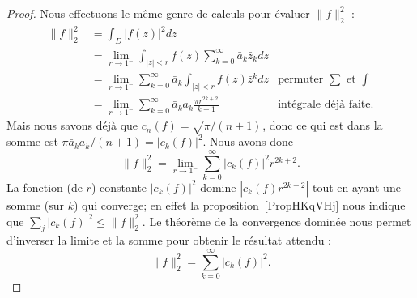 \begin{proof}
    Nous effectuons le même genre de calculs pour évaluer \( \| f \|^2_2\) :
    \begin{subequations}
        \begin{align}
            \| f \|_2^2&=\int_D| f(z) |^2dz\\
            &=\lim_{r\to 1^-}\int_{| z |<r}f(z)\sum_{k=0}^{\infty}\bar a_k\bar z_kdz\\
            &=\lim_{r\to 1^-}\sum_{k=0}^{\infty}\bar a_k\int_{| z |<r}f(z)\bar z^kdz&\text{permuter } \sum\text{ et } \int\\
            &=\lim_{r\to 1^-}\sum_{k=0}^{\infty}\bar a_ka_k\frac{ \pi r^{2k+2} }{ k+1 }&\text{intégrale déjà faite}.
        \end{align}
    \end{subequations}
    Mais nous savons déjà que \( c_n(f)=\sqrt{\pi/(n+1)}\), donc ce qui est dans la somme est \( \pi\bar a_ka_k/(n+1)=| c_k(f) |^2\). Nous avons donc
    \begin{equation}
        \| f \|^2_2=\lim_{r\to 1^-}\sum_{k=0}^{\infty}| c_k(f) |^2 r^{2k+2}.
    \end{equation}
    La fonction (de \( r\)) constante \( | c_k(f) |^2\) domine \( | c_k(f)r^{2k+2} |\) tout en ayant une somme (sur \( k\)) qui converge; en effet la proposition~\ref{PropHKqVHj} nous indique que \( \sum_j| c_k(f) |^2\leq \| f \|_2^2\). Le théorème de la convergence dominée nous permet d'inverser la limite et la somme pour obtenir le résultat attendu :
    \begin{equation}
        \| f \|_2^2=\sum_{k=0}^{\infty}| c_k(f) |^2.
    \end{equation}
\end{proof}
